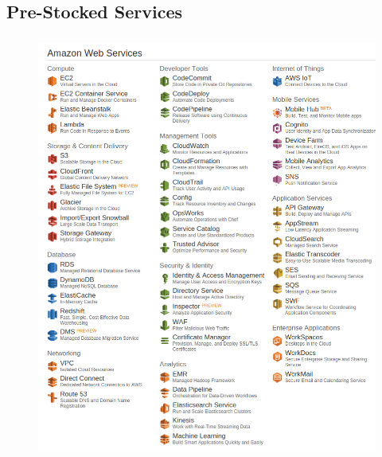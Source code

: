 \documentclass[10pt]{beamer}
\makeatletter
\newcommand*{\currentname}{\@currentlabelname}
\makeatother
\begin{document}
\subsection{Pre-Stocked Services}
\begin{frame}
	\frametitle{\currentname}

	\begin{figure}[c]
		\includegraphics[height=0.8\textheight]{./images/aws-console.png}
		\\
	\end{figure}
\end{frame}
\end{document}
